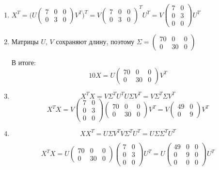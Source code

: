 \documentclass[12pt]{article} %
\theoremstyle{definition} %
\begin{document}
\begin{enumerate}
\item $X^T = \Big( U\begin{pmatrix}
7 & 0 & 0 \\
0 & 3 & 0
\end{pmatrix} V^T\Big)^T=V\begin{pmatrix}
7 & 0 & 0 \\
0 & 3 & 0
\end{pmatrix}^T U^T =
V\begin{pmatrix}
7 & 0  \\
0 & 3  \\
0 & 0
\end{pmatrix} U^T$
\item Матрицы $U$, $V$ сохраняют длину, поэтому
$\Sigma = \begin{pmatrix}
70 & 0 & 0 \\
0 & 30 & 0
\end{pmatrix}$

В итоге:
\[10X= U\begin{pmatrix}
70 & 0 & 0 \\
0 & 30 & 0
\end{pmatrix} V^T
\]

\item
\[X^TX= V \Sigma^T U^T U \Sigma V^T= V \Sigma^T \Sigma V^T
\]
\[X^TX  = V\begin{pmatrix}
7 & 0  \\
0 & 3  \\
0 & 0
\end{pmatrix} \begin{pmatrix}
70 & 0 & 0 \\
0 & 30 & 0
\end{pmatrix} V^T=
V\begin{pmatrix}
49 & 0  \\
0 & 9
\end{pmatrix}  V^T
\]


\item \[XX^T= U \Sigma V^T V \Sigma^T U^T = U \Sigma \Sigma^T U^T
\]

\[ X^TX =U\begin{pmatrix}
70 & 0 & 0 \\
0 & 30 & 0
\end{pmatrix} \begin{pmatrix}
7 & 0  \\
0 & 3  \\
0 & 0
\end{pmatrix} U^T =
U\begin{pmatrix}
49 & 0 & 0 \\
0 & 9 & 0 \\
0 & 0 & 0
\end{pmatrix} U^T
\]
\end{enumerate}
\end{document}
